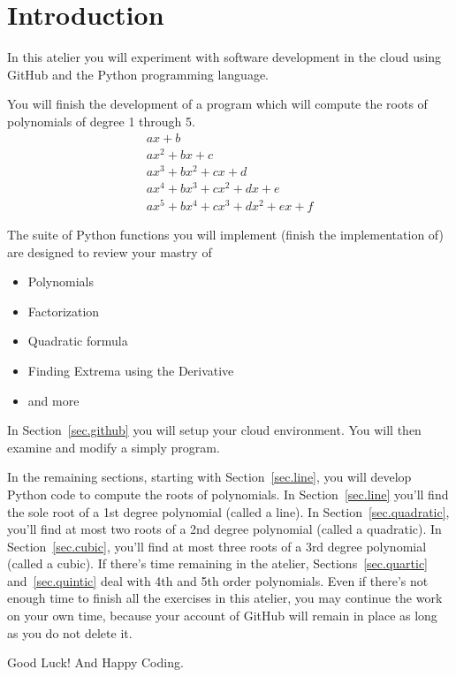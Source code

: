\section{Introduction}
\label{sec.intro}

In this atelier you will experiment with software development
in the cloud using GitHub and the Python programming language.

You will finish the development of a program which will compute the
roots of polynomials of degree 1 through 5.
\begin{align*}
  a x + b\\
  a x^2 + b x + c\\
  a x^3 + b x^2 + c x + d\\
  a x^4 + b x^3 + c x^2 + d x + e\\
  a x^5 + b x^4 + c x^3 + d x^2 + e x + f
\end{align*}

The suite of Python functions you will implement (finish the implementation of)
are designed to review your mastry of
\begin{itemize}
\item Polynomials
\item Factorization
\item Quadratic formula
\item Finding Extrema using the Derivative
\item and more
\end{itemize}

In Section~\ref{sec.github} you will setup your cloud environment. You will
then examine and modify a simply  program.

In the remaining sections, starting with Section~\ref{sec.line}, you
will develop Python code to compute the roots of polynomials.  In
Section~\ref{sec.line} you'll find the sole root of a 1st degree
polynomial (called a line).  In Section~\ref{sec.quadratic}, you'll
find at most two roots of a 2nd degree polynomial (called a
quadratic). In Section~\ref{sec.cubic}, you'll find at most three
roots of a 3rd degree polynomial (called a cubic).  If there's time
remaining in the atelier, Sections~\ref{sec.quartic}
and~\ref{sec.quintic} deal with 4th and 5th order polynomials.  Even
if there's not enough time to finish all the exercises in this
atelier, you may continue the work on your own time, because your
account of GitHub will remain in place as long as you do not
delete it.

Good Luck! And Happy Coding.


